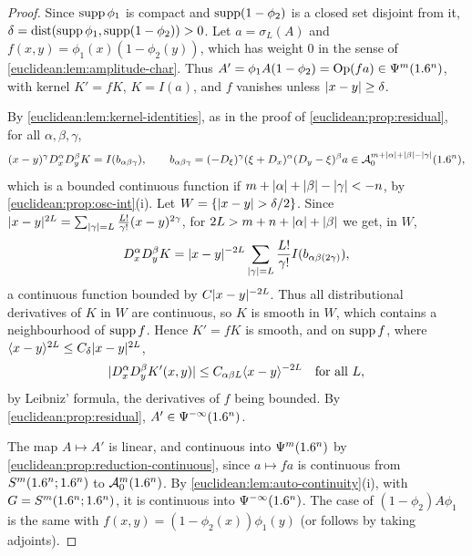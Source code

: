 \begin{proof}
  Since $\operatorname{supp}\phi_1$ is compact and $\operatorname{supp}(1-\phi_2)$ is a closed set
  disjoint from it, $\delta=\operatorname{dist}(\operatorname{supp}\phi_1,\operatorname{supp}(1-\phi_2))>0$.
  Let $a=\sigma_L(A)$ and $f(x,y)=\phi_1(x)(1-\phi_2(y))$, which has weight
  $0$ in the sense of \cref{euclidean:lem:amplitude-char}. Thus
  $A'=\phi_1A(1-\phi_2)=\operatorname{Op}(fa)\in\Psi^{m}(1.6^n)$, with kernel $K'=fK$,
  $K=I(a)$, and $f$ vanishes unless $\lvert x-y\rvert\ge\delta$.

  By \cref{euclidean:lem:kernel-identities}, as in the proof of
  \cref{euclidean:prop:residual}, for all $\alpha,\beta,\gamma$,
  \begin{equation*}
    (x-y)^{\gamma}D^\alpha_xD^\beta_yK=I(b_{\alpha\beta\gamma}),\qquad
    b_{\alpha\beta\gamma}=(-D_\xi)^\gamma(\xi+D_x)^\alpha(D_y-\xi)^\beta a
    \in\mathcal{A}^{m+\lvert \alpha\rvert+\lvert \beta\rvert-\lvert \gamma\rvert}_{0}(1.6^n),
  \end{equation*}
  which is a bounded continuous function if $m+\lvert \alpha\rvert+\lvert \beta\rvert-\lvert \gamma\rvert<-n$,
  by \cref{euclidean:prop:osc-int}(i). Let $W=\{\lvert x-y\rvert>\delta/2\}$. Since
  $\lvert x-y\rvert^{2L}=\sum_{\lvert \gamma\rvert=L}\frac{L!}{\gamma!}(x-y)^{2\gamma}$, for
  $2L>m+n+\lvert \alpha\rvert+\lvert \beta\rvert$ we get, in $W$,
  \begin{equation*}
    D^\alpha_xD^\beta_yK=\lvert x-y\rvert^{-2L}\sum_{\lvert \gamma\rvert=L}\frac{L!}{\gamma!}
    I(b_{\alpha\beta(2\gamma)}),
  \end{equation*}
  a continuous function bounded by $C\lvert x-y\rvert^{-2L}$. Thus all
  distributional derivatives of $K$ in $W$ are continuous, so $K$ is smooth
  in $W$, which contains a neighbourhood of $\operatorname{supp} f$. Hence $K'=fK$ is
  smooth, and on $\operatorname{supp} f$, where $\langle x-y\rangle^{2L}\le C_\delta\lvert x-y\rvert^{2L}$,
  \begin{equation*}
    \lvert D^\alpha_xD^\beta_yK'(x,y)\rvert\le C_{\alpha\beta L}\langle x-y\rangle^{-2L}
    \quad\text{for all }L,
  \end{equation*}
  by Leibniz' formula, the derivatives of $f$ being bounded. By
  \cref{euclidean:prop:residual}, $A'\in\Psi^{-\infty}(1.6^n)$.

  The map $A\mapsto A'$ is linear, and continuous into $\Psi^{m}(1.6^n)$ by
  \cref{euclidean:prop:reduction-continuous}, since $a\mapsto fa$ is
  continuous from $S^m(1.6^n;1.6^n)$ to $\mathcal{A}^{m}_{0}(1.6^n)$. By
  \cref{euclidean:lem:auto-continuity}(i), with $G=S^m(1.6^n;1.6^n)$, it is
  continuous into $\Psi^{-\infty}(1.6^n)$. The case of $(1-\phi_2)A\phi_1$
  is the same with $f(x,y)=(1-\phi_2(x))\phi_1(y)$ (or follows by taking
  adjoints).
\end{proof}

